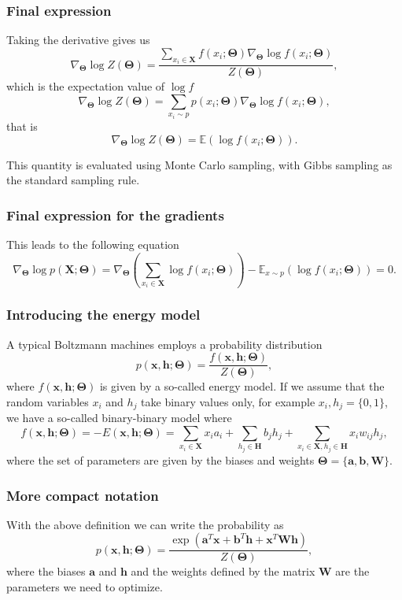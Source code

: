 \documentclass[11pt]{beamer} %
\begin{document}
\begin{frame}
\frametitle{Final expression}

Taking the derivative gives us
\[
\nabla_{\mathbf{\Theta}}\log{Z(\mathbf{\Theta})}=\frac{ \sum_{x_i\in \mathbf{X}}f(x_i;\mathbf{\Theta}) \nabla_{\mathbf{\Theta}}\log{f(x_i;\mathbf{\Theta})}   }{Z(\mathbf{\Theta})}, 
\]
which is the expectation value of $\log{f}$
\[
\nabla_{\mathbf{\Theta}}\log{Z(\mathbf{\Theta})}=\sum_{x_i\sim p}p(x_i;\mathbf{\Theta}) \nabla_{\mathbf{\Theta}}\log{f(x_i;\mathbf{\Theta})},
\]
that is
\[
\nabla_{\mathbf{\Theta}}\log{Z(\mathbf{\Theta})}=\mathbb{E}(\log{f(x_i;\mathbf{\Theta})}).
\]

This quantity is evaluated using Monte Carlo sampling, with Gibbs
sampling as the standard sampling rule.
\end{frame}

\begin{frame}
\frametitle{Final expression for the gradients}

This leads to the following equation
\[
\nabla_{\mathbf{\Theta}}\log{p(\mathbf{X};\mathbf{\Theta})}=\nabla_{\mathbf{\Theta}}\left(\sum_{x_i\in \mathbf{X}}\log{f(x_i;\mathbf{\Theta})}\right)-\mathbb{E}_{x\sim p}(\log{f(x_i;\mathbf{\Theta})})=0.
\]
\end{frame}

\begin{frame}
\frametitle{Introducing the energy model}

A typical Boltzmann machines employs a probability distribution
\[
p(\mathbf{x},\mathbf{h};\mathbf{\Theta}) = \frac{f(\mathbf{x},\mathbf{h};\mathbf{\Theta})}{Z(\mathbf{\Theta})},
\]
where $f(\mathbf{x},\mathbf{h};\mathbf{\Theta})$ is given by a so-called energy model. If we assume that the random variables $x_i$ and $h_j$ take binary values only, for example $x_i,h_j=\{0,1\}$, we have a so-called binary-binary model where
\[
f(\mathbf{x},\mathbf{h};\mathbf{\Theta})=-E(\mathbf{x}, \mathbf{h};\mathbf{\Theta}) = \sum_{x_i\in \mathbf{X}} x_i a_i+\sum_{h_j\in \mathbf{H}} b_j h_j + \sum_{x_i\in \mathbf{X},h_j\in\mathbf{H}} x_i w_{ij} h_j,
\]
where the set of parameters are given by the biases and weights $\mathbf{\Theta}=\{\mathbf{a},\mathbf{b},\mathbf{W}\}$.
\end{frame}

\begin{frame}
\frametitle{More compact notation}

With the above definition we can write the probability as
\[
p(\mathbf{x},\mathbf{h};\mathbf{\Theta}) = \frac{\exp{(\mathbf{a}^T\mathbf{x}+\mathbf{b}^T\mathbf{h}+\mathbf{x}^T\mathbf{W}\mathbf{h})}}{Z(\mathbf{\Theta})},
\]
where the biases $\mathbf{a}$ and $\mathbf{h}$ and the weights defined by the matrix $\mathbf{W}$ are the parameters we need to optimize.
\end{frame}
\end{document}
